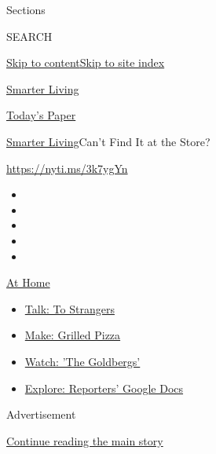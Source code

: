 Sections

SEARCH

\protect\hyperlink{site-content}{Skip to
content}\protect\hyperlink{site-index}{Skip to site index}

\href{https://www.nytimes.com/section/smarter-living}{Smarter Living}

\href{https://myaccount.nytimes.com/auth/login?response_type=cookie\&client_id=vi}{}

\href{https://www.nytimes.com/section/todayspaper}{Today's Paper}

\href{/section/smarter-living}{Smarter Living}\textbar{}Can't Find It at
the Store?

\url{https://nyti.ms/3k7ygYn}

\begin{itemize}
\item
\item
\item
\item
\item
\end{itemize}

\href{https://www.nytimes.com/spotlight/at-home?action=click\&pgtype=Article\&state=default\&region=TOP_BANNER\&context=at_home_menu}{At
Home}

\begin{itemize}
\tightlist
\item
  \href{https://www.nytimes.com/2020/08/03/well/family/the-benefits-of-talking-to-strangers.html?action=click\&pgtype=Article\&state=default\&region=TOP_BANNER\&context=at_home_menu}{Talk:
  To Strangers}
\item
  \href{https://www.nytimes.com/2020/08/01/at-home/coronavirus-make-pizza-on-a-grill.html?action=click\&pgtype=Article\&state=default\&region=TOP_BANNER\&context=at_home_menu}{Make:
  Grilled Pizza}
\item
  \href{https://www.nytimes.com/2020/07/31/arts/television/goldbergs-abc-stream.html?action=click\&pgtype=Article\&state=default\&region=TOP_BANNER\&context=at_home_menu}{Watch:
  'The Goldbergs'}
\item
  \href{https://www.nytimes.com/interactive/2020/at-home/even-more-reporters-editors-diaries-lists-recommendations.html?action=click\&pgtype=Article\&state=default\&region=TOP_BANNER\&context=at_home_menu}{Explore:
  Reporters' Google Docs}
\end{itemize}

Advertisement

\protect\hyperlink{after-top}{Continue reading the main story}

